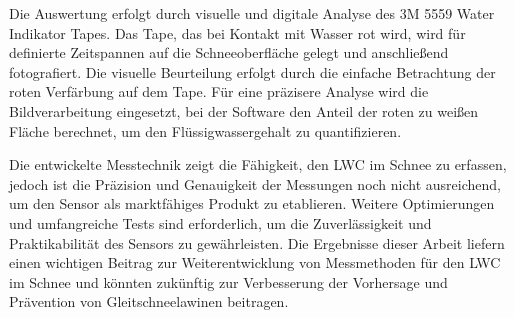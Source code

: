 Die Auswertung erfolgt durch visuelle und digitale Analyse des 3M 5559 Water Indikator Tapes. Das Tape, das bei Kontakt mit Wasser rot wird, wird für definierte Zeitspannen auf die Schneeoberfläche gelegt und anschließend fotografiert. Die visuelle Beurteilung erfolgt durch die einfache Betrachtung der roten Verfärbung auf dem Tape. Für eine präzisere Analyse wird die Bildverarbeitung eingesetzt, bei der Software den Anteil der roten zu weißen Fläche berechnet, um den Flüssigwassergehalt zu quantifizieren.

Die entwickelte Messtechnik zeigt die Fähigkeit, den LWC im Schnee zu erfassen, jedoch ist die Präzision und Genauigkeit der Messungen noch nicht ausreichend, um den Sensor als marktfähiges Produkt zu etablieren. Weitere Optimierungen und umfangreiche Tests sind erforderlich, um die Zuverlässigkeit und Praktikabilität des Sensors zu gewährleisten. Die Ergebnisse dieser Arbeit liefern einen wichtigen Beitrag zur Weiterentwicklung von Messmethoden für den LWC im Schnee und könnten zukünftig zur Verbesserung der Vorhersage und Prävention von Gleitschneelawinen beitragen.

\fi
